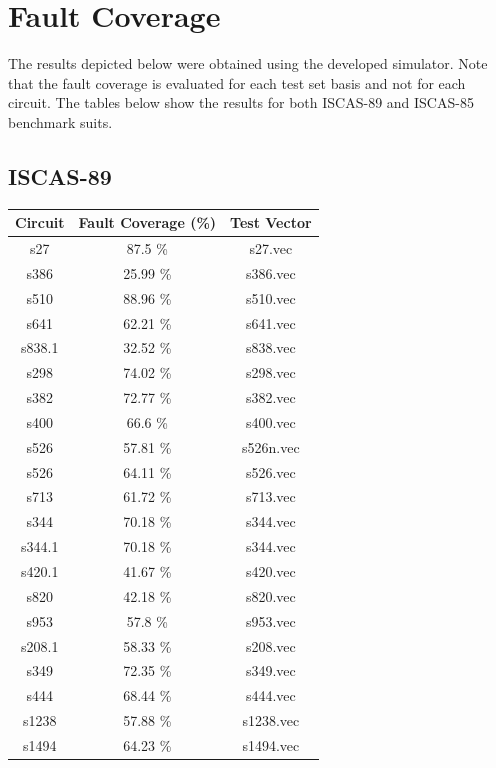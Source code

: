 \documentclass[a4paper,12pt]{article}
\begin{document}
\clearpage

\section*{Fault Coverage}
The results depicted below were obtained using the developed simulator. Note that the fault coverage is evaluated for each test set basis and not for each circuit. The tables below show the results for both ISCAS-89 and ISCAS-85 benchmark suits.

\subsection*{ISCAS-89}
\begin{center}
\begin{tabular}{||c c c||}
\hline
Circuit & Fault Coverage (\%) & Test Vector \\ [0.5ex] 
\hline\hline
s27 & 87.5 \%  & s27.vec \\ 
\hline
s386 & 25.99 \%  & s386.vec \\ 
\hline
s510 & 88.96 \%  & s510.vec \\ 
\hline
s641 & 62.21 \%  & s641.vec \\ 
\hline
s838.1 & 32.52 \%  & s838.vec \\ 
\hline
s298 & 74.02 \%  & s298.vec \\ 
\hline
s382 & 72.77 \%  & s382.vec \\ 
\hline
s400 & 66.6 \%  & s400.vec \\ 
\hline
s526 & 57.81 \%  & s526n.vec \\ 
\hline
s526 & 64.11 \%  & s526.vec \\ 
\hline
s713 & 61.72 \%  & s713.vec \\ 
\hline
s344 & 70.18 \%  & s344.vec \\ 
\hline
s344.1 & 70.18 \%  & s344.vec \\ 
\hline
s420.1 & 41.67 \%  & s420.vec \\ 
\hline
s820 & 42.18 \%  & s820.vec \\ 
\hline
s953 & 57.8 \%  & s953.vec \\ 
\hline
s208.1 & 58.33 \%  & s208.vec \\ 
\hline
s349 & 72.35 \%  & s349.vec \\ 
\hline
s444 & 68.44 \%  & s444.vec \\ 
\hline
s1238 & 57.88 \%  & s1238.vec \\ 
\hline
s1494 & 64.23 \%  & s1494.vec \\ 

\end{tabular}
\end{center}
\end{document}

